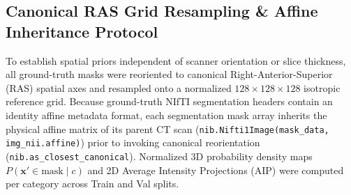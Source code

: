 \documentclass[11pt,a4paper]{article}
\begin{document}
\subsection{Canonical RAS Grid Resampling \& Affine Inheritance Protocol}
To establish spatial priors independent of scanner orientation or slice thickness, all ground-truth masks were reoriented to canonical Right-Anterior-Superior (RAS) spatial axes and resampled onto a normalized $128 \times 128 \times 128$ isotropic reference grid. Because ground-truth NIfTI segmentation headers contain an identity affine metadata format, each segmentation mask array inherits the physical affine matrix of its parent CT scan (\texttt{nib.Nifti1Image(mask\_data, img\_nii.affine)}) prior to invoking canonical reorientation (\texttt{nib.as\_closest\_canonical}). Normalized 3D probability density maps $P(\mathbf{x}' \in \text{mask} \mid c)$ and 2D Average Intensity Projections (AIP) were computed per category across Train and Val splits.
\end{document}
